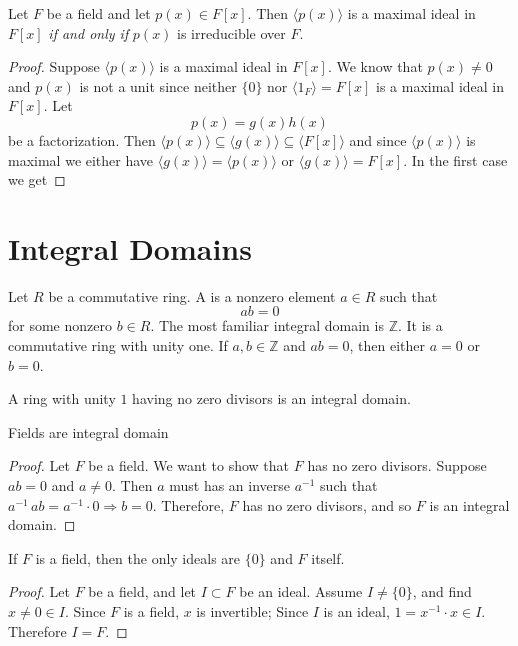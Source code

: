 \begin{theorem}
    Let $F$ be a field and let $p(x) \in F[x]$. Then $\langle p(x) \rangle$ is a maximal ideal in $F[x]$
    \textit{if and only if} $p(x)$ is irreducible over $F$.
\end{theorem}
\begin{proof}
    Suppose $\langle p(x) \rangle$ is a maximal ideal in $F[x]$. We know that $p(x) \neq 0$ and 
    $p(x)$ is not a unit since neither $\{ 0 \}$ nor $\langle 1_F \rangle = F[x]$ is a 
    maximal ideal in $F[x]$. Let 
    \[
        p(x) = g(x) h(x)
    \]
    be a factorization. Then $\langle p(x) \rangle \subseteq \langle g(x) \rangle 
    \subseteq \langle F[x] \rangle$ and since $\langle p(x) \rangle$ is maximal we either have 
    $\langle g(x) \rangle = \langle p(x) \rangle$ or $\langle g(x) \rangle = F[x]$. In the 
    first case we get 
\end{proof}

\section{Integral Domains}

Let $R$ be a commutative ring. A  is a nonzero element $a \in R$ such that 
\begin{equation}
    ab=0
\end{equation}
for some nonzero $b \in R$. The most familiar integral domain is $\mathbb{Z}$. It is a 
commutative ring with unity one. If $a, b \in \mathbb{Z}$ and $ab=0$, then either $a=0$ or 
$b=0$.

\begin{definition}
    A ring with unity $1$ having no zero divisors is an integral domain.
\end{definition}

\begin{lemma}
    Fields are integral domain
\end{lemma}
\begin{proof}
    Let $F$ be a field. We want to show that $F$ has no zero divisors. Suppose $ab =0$ and 
    $a \neq 0$. Then $a$ must has an inverse $a^{-1}$ such that $a^{-1}\, a b = a^{-1} \cdot 0 \Longrightarrow b = 0$.
    Therefore, $F$ has no zero divisors, and so $F$ is an integral domain.
\end{proof}

\begin{definition}
    If $F$ is a field, then the only ideals are $\{0\}$ and $F$ itself.
\end{definition}
\begin{proof}
    Let $F$ be a field, and let $I \subset F$ be an ideal. Assume $I \neq \{0 \}$, and find $x \neq 0 \in I$. 
    Since  $F$ is a field, $x$ is invertible; Since $I$ is an ideal, $1 = x^{-1} \cdot x \in I$. Therefore $I = F$.
\end{proof}

